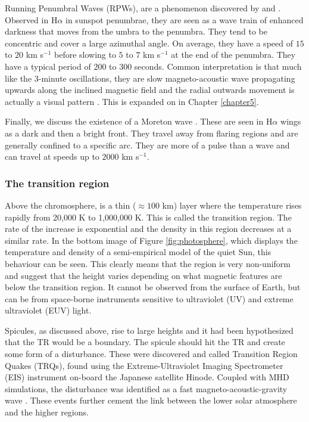     Running Penumbral Waves (RPWs), are a phenomenon discovered by \cite{Zirin1972} and \cite{Giovanelli1972}. 
    Observed in H$\alpha$ in sunspot penumbrae, they are seen as a wave train of enhanced darkness that moves from the umbra to the penumbra.
    They tend to be concentric and cover a large azimuthal angle.
    On average, they have a speed of $15$ to $20$ km s$^{-1}$ before slowing to $5$ to $7$ km s$^{-1}$ at the end of the penumbra.
    They have a typical period of $200$ to $300$ seconds. 
    Common interpretation is that much like the $3$-minute oscillations, they are slow magneto-acoustic wave propagating upwards along the inclined magnetic field and the radial outwards movement is actually a visual pattern \citep{UTMO,ORWS,OASO}.
    This is expanded on in Chapter \ref{chapter5}.
    
    Finally, we discuss the existence of a Moreton wave \citep{1960AJ.....65U.494M}.
    These are seen in H$\alpha$ wings as a dark and then a bright front.
    They travel away from flaring regions and are generally confined to a specific arc.
    They are more of a pulse than a wave and can travel at speeds up to $2000$ km s$^{-1}$.
            
\subsubsection{The transition region}

    Above the chromosphere, is a thin ($\approx100$ km) layer where the temperature rises rapidly from 20,000 K to 1,000,000 K.
    This is called the transition region.
    The rate of the increase is exponential and the density in this region decreases at a similar rate.
    In the bottom image of Figure \ref{fig:photosphere}, which displays the temperature and density of a semi-empirical model of the quiet Sun, this behaviour can be seen.
    This clearly means that the region is very non-uniform and \cite{tian2009solar} suggest that the height varies depending on what magnetic features are below the transition region.
    It cannot be observed from the surface of Earth, but can be from space-borne instruments sensitive to ultraviolet (UV) and extreme ultraviolet (EUV) light.
    
    Spicules, as discussed above, rise to large heights and it had been hypothesized that the TR would be a boundary.
    The spicule should hit the TR and create some form of a disturbance.
    These were discovered and called Transition Region Quakes (TRQs), found using the Extreme-Ultraviolet Imaging Spectrometer (EIS) instrument on-board the Japanese satellite Hinode.
    Coupled with MHD simulations, the disturbance was identified as a fast magneto-acoustic-gravity wave \citep{0004-637X-743-1-14}.
    These events further cement the link between the lower solar atmosphere and the higher regions.
    
